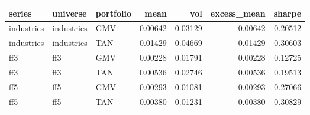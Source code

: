 \begin{tabular}{lllrrrr}
\toprule
series & universe & portfolio & mean & vol & excess\_mean & sharpe \\
\midrule
industries & industries & GMV & 0.00642 & 0.03129 & 0.00642 & 0.20512 \\
industries & industries & TAN & 0.01429 & 0.04669 & 0.01429 & 0.30603 \\
ff3 & ff3 & GMV & 0.00228 & 0.01791 & 0.00228 & 0.12725 \\
ff3 & ff3 & TAN & 0.00536 & 0.02746 & 0.00536 & 0.19513 \\
ff5 & ff5 & GMV & 0.00293 & 0.01081 & 0.00293 & 0.27066 \\
ff5 & ff5 & TAN & 0.00380 & 0.01231 & 0.00380 & 0.30829 \\
\bottomrule
\end{tabular}
